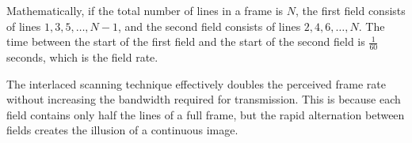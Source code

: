 Mathematically, if the total number of lines in a frame is \( N \), the first field consists of lines \( 1, 3, 5, \ldots, N-1 \), and the second field consists of lines \( 2, 4, 6, \ldots, N \). The time between the start of the first field and the start of the second field is \( \frac{1}{60} \) seconds, which is the field rate.

The interlaced scanning technique effectively doubles the perceived frame rate without increasing the bandwidth required for transmission. This is because each field contains only half the lines of a full frame, but the rapid alternation between fields creates the illusion of a continuous image.

